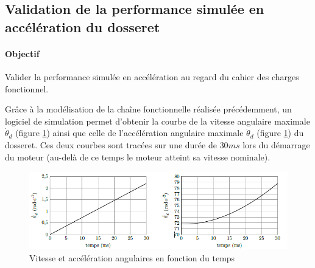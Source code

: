 
\newpage

\subsection{Validation de la performance simulée en accélération du dosseret}

\paragraph{Objectif} Valider la performance simulée en accélération au regard du cahier des charges fonctionnel.

Grâce à la modélisation de la chaîne fonctionnelle réalisée précédemment, un logiciel de simulation permet d'obtenir la courbe de la vitesse angulaire maximale $\dot{\theta}_d$ (figure \ref{fig15}) ainsi que celle de l'accélération angulaire maximale $\ddot{\theta}_d$ (figure \ref{fig15}) du dosseret. Ces deux courbes sont tracées sur une durée de $30ms$ lors du démarrage du moteur (au-delà de ce temps le moteur atteint sa vitesse nominale).

\begin{figure}[!ht]
\begin{center}
 \includegraphics[width=0.9\linewidth]{img/img15}
\end{center}
\caption{Vitesse et accélération angulaires en fonction du temps}
\label{fig15}
\end{figure}


